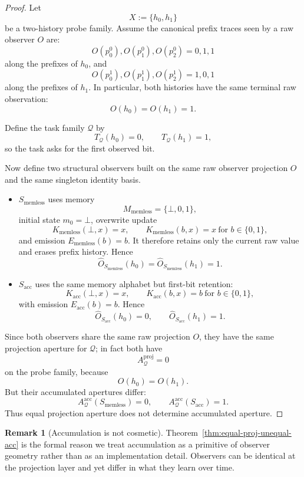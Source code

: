 \documentclass[11pt,twoside]{article}
\theoremstyle{definition}
\newtheorem{remark}[theorem]{Remark}
\newcommand{\proj}{\mathrm{proj}}
\newcommand{\acc}{\mathrm{acc}}
\begin{document}
\begin{proof}
Let
\[
  X := \{ h_0, h_1 \}
\]
be a two-history probe family. Assume the canonical prefix traces seen by a raw observer \(O\) are:
\[
  O(p^0_0), O(p^0_1), O(p^0_2) = 0,1,1
\]
along the prefixes of \(h_0\), and
\[
  O(p^1_0), O(p^1_1), O(p^1_2) = 1,0,1
\]
along the prefixes of \(h_1\). In particular, both histories have the same terminal raw observation:
\[
  O(h_0)=O(h_1)=1.
\]

Define the task family \(\mathcal{Q}\) by
\[
  T_{\mathcal{Q}}(h_0)=0,
  \qquad
  T_{\mathcal{Q}}(h_1)=1,
\]
so the task asks for the first observed bit.

Now define two structural observers built on the same raw observer projection \(O\) and the same singleton identity basis.

\begin{itemize}[leftmargin=*]
  \item \(S_{\mathrm{memless}}\) uses memory
        \[
          M_{\mathrm{memless}}=\{\bot,0,1\},
        \]
        initial state \(m_0=\bot\), overwrite update
        \[
          K_{\mathrm{memless}}(\bot,x)=x,\qquad K_{\mathrm{memless}}(b,x)=x\ \text{for }b\in\{0,1\},
        \]
        and emission \(E_{\mathrm{memless}}(b)=b\). It therefore retains only the current raw value and erases prefix history. Hence
        \[
          \widehat{O}_{S_{\mathrm{memless}}}(h_0)
          =
          \widehat{O}_{S_{\mathrm{memless}}}(h_1)
          =
          1.
        \]
  \item \(S_{\mathrm{acc}}\) uses the same memory alphabet but first-bit retention:
        \[
          K_{\mathrm{acc}}(\bot,x)=x,\qquad K_{\mathrm{acc}}(b,x)=b\ \text{for }b\in\{0,1\},
        \]
        with emission \(E_{\mathrm{acc}}(b)=b\). Hence
        \[
          \widehat{O}_{S_{\mathrm{acc}}}(h_0)=0,
          \qquad
          \widehat{O}_{S_{\mathrm{acc}}}(h_1)=1.
        \]
\end{itemize}

Since both observers share the same raw projection \(O\), they have the same projection aperture for \(\mathcal{Q}\); in fact both have
\[
  A^{\proj}_{\mathcal{Q}} = 0
\]
on the probe family, because
\[
  O(h_0)=O(h_1).
\]
But their accumulated apertures differ:
\[
  A^{\acc}_{\mathcal{Q}}(S_{\mathrm{memless}})=0,
  \qquad
  A^{\acc}_{\mathcal{Q}}(S_{\mathrm{acc}})=1.
\]
Thus equal projection aperture does not determine accumulated aperture.
\end{proof}

\begin{remark}[Accumulation is not cosmetic]
\label{rem:acc-not-cosmetic}
Theorem~\ref{thm:equal-proj-unequal-acc} is the formal reason we treat accumulation as a primitive of observer geometry rather than as an implementation detail. Observers can be identical at the projection layer and yet differ in what they learn over time.
\end{remark}
\end{document}
